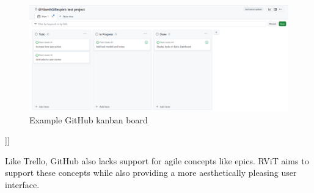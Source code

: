 \documentclass[l4proj.tex]{subfiles}
\begin{document}
\begin{figure}[h!]
\begin{center}
\includegraphics[scale=0.35]{dissertation/images/GitHubKanbanBoard.png}
\caption{Example GitHub kanban board}
\label{fig:GitHub kanban} 
\end{center}
\end{figure}
]]

Like Trello, GitHub also lacks support for agile concepts like epics. RViT aims to support these concepts while also providing a more aesthetically pleasing user interface. 
\end{document}
